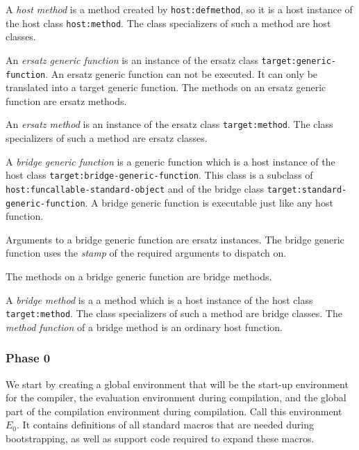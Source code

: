 \begin{definition}
A \emph{host method} is a method created by \texttt{host:defmethod},
so it is a host instance of the host class \texttt{host:method}.  The
class specializers of such a method are host classes.
\end{definition}

\begin{definition}
An \emph{ersatz generic function} is an instance of the ersatz class
\texttt{target:generic-function}.  An ersatz generic function can not
be executed.  It can only be translated into a target generic function.
The methods on an ersatz generic function are ersatz methods. 
\end{definition}

\begin{definition}
An \emph{ersatz method} is an instance of the ersatz class
\texttt{target:method}.  The class specializers of such a method are
ersatz classes.
\end{definition}

\begin{definition}
A \emph{bridge generic function} is a generic function which is a host
instance of the host class \texttt{target:bridge-generic-function}.
This class is a subclass of \texttt{host:funcallable-standard-object}
and of the bridge class \texttt{target:standard-generic-function}.
A bridge generic function is executable just like any host function.

Arguments to a bridge generic function are ersatz instances.  The
bridge generic function uses the 
\emph{stamp}
 of
the required arguments to dispatch on. 

The methods on a bridge generic function are bridge methods.
\end{definition}

\begin{definition}
A \emph{bridge method} is a a method which is a host instance of the host
class \texttt{target:method}.  The class specializers of such a method are
bridge classes.  The \emph{method function} of a bridge method is an
ordinary host function.
\end{definition}

\subsubsection{Phase 0}

We start by creating a \sysname{} global environment that will be the
start-up environment for the compiler, the evaluation environment
during compilation, and the global part of the compilation environment
during compilation.  Call this environment $E_0$.  It contains
definitions of all standard \commonlisp{} macros that are needed
during bootstrapping, as well as support code required to expand these
macros.

